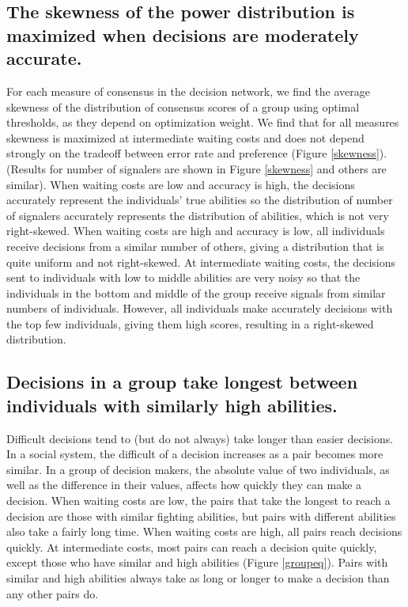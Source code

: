 \documentclass{article}
\begin{document}
\subsection{The skewness of the power distribution is maximized when decisions are moderately accurate. }
For each measure of consensus in the decision network, we find the average skewness of the distribution of consensus scores of a group using optimal thresholds, as they depend on optimization weight.  We find that for all measures skewness is maximized at intermediate waiting costs and does not depend strongly on the tradeoff between error rate and preference (Figure \ref{skewness}). (Results for number of signalers are shown in Figure \ref{skewness} and others are similar).  When waiting costs are low and accuracy is high, the decisions accurately represent the individuals' true  abilities so the distribution of number of signalers accurately represents the distribution of abilities, which is not very right-skewed.  When waiting costs are high and accuracy is low, all individuals receive decisions from a similar number of others, giving a distribution that is quite uniform and not right-skewed.  At intermediate waiting costs, the decisions sent to individuals with low to middle abilities are very noisy so that the individuals in the bottom and middle of the group receive signals from similar numbers of individuals.  However, all individuals make accurately decisions with the top few individuals, giving them high scores, resulting in a right-skewed distribution.


\subsection{Decisions in a group take longest between individuals with similarly high abilities. }
Difficult decisions tend to (but do not always) take longer than easier decisions.  In a social system, the difficult of a decision increases as a pair becomes more similar.  In a group of decision makers, the absolute value of two individuals, as well as the difference in their values, affects how quickly they can make a decision.  When waiting costs are low, the pairs that take the longest to reach a decision are those with similar fighting abilities, but pairs with different abilities also take a fairly long time.  When waiting costs are high, all pairs reach decisions quickly.  At intermediate costs, most pairs can reach a decision quite quickly, except those who have similar and high abilities (Figure \ref{groupeq}).  Pairs with similar and high abilities always take as long or longer to make a decision than any other pairs do.
 
\end{document}
